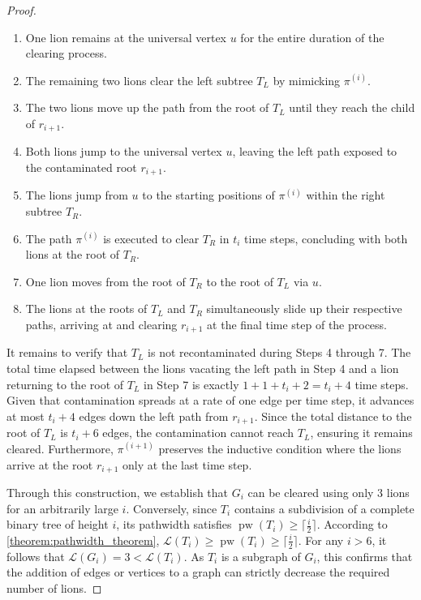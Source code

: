 \documentclass[10pt,a4paper]{amsart}
\begin{document}
\begin{proof}
\begin{enumerate}
    \item One lion remains at the universal vertex $u$ for the entire duration of the clearing process.
    \item The remaining two lions clear the left subtree $T_L$ by mimicking $\pi^{(i)}$.
    \item The two lions move up the path from the root of $T_L$ until they reach the child of $r_{i+1}$.
    \item Both lions jump to the universal vertex $u$, leaving the left path exposed to the contaminated root $r_{i+1}$.
    \item The lions jump from $u$ to the starting positions of $\pi^{(i)}$ within the right subtree $T_R$.
    \item The path $\pi^{(i)}$ is executed to clear $T_R$ in $t_i$ time steps, concluding with both lions at the root of $T_R$.
    \item One lion moves from the root of $T_R$ to the root of $T_L$ via $u$.
    \item The lions at the roots of $T_L$ and $T_R$ simultaneously slide up their respective paths, arriving at and clearing $r_{i+1}$ at the final time step of the process.
\end{enumerate}

It remains to verify that $T_L$ is not recontaminated during Steps 4 through 7. The total time elapsed between the lions vacating the left path in Step 4 and a lion returning to the root of $T_L$ in Step 7 is exactly $1 + 1 + t_i + 2 = t_i + 4$ time steps. Given that contamination spreads at a rate of one edge per time step, it advances at most $t_i+4$ edges down the left path from $r_{i+1}$. Since the total distance to the root of $T_L$ is $t_i+6$ edges, the contamination cannot reach $T_L$, ensuring it remains cleared. Furthermore, $\pi^{(i+1)}$ preserves the inductive condition where the lions arrive at the root $r_{i+1}$ only at the last time step.

Through this construction, we establish that $G_i$ can be cleared using only $3$ lions for an arbitrarily large $i$. Conversely, since $T_i$ contains a subdivision of a complete binary tree of height $i$, its pathwidth satisfies $\operatorname{pw}(T_i) \geq \lceil \frac{i}{2} \rceil$. According to \cref{theorem:pathwidth_theorem}, $\mathcal{L}(T_i) \geq \operatorname{pw}(T_i) \geq \lceil \frac{i}{2} \rceil$. For any $i > 6$, it follows that $\mathcal{L}(G_i) = 3 < \mathcal{L}(T_i)$. As $T_i$ is a subgraph of $G_i$, this confirms that the addition of edges or vertices to a graph can strictly decrease the required number of lions.
\end{proof}
\end{document}
